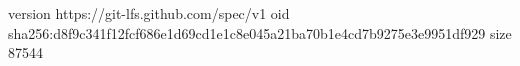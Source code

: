 version https://git-lfs.github.com/spec/v1
oid sha256:d8f9c341f12fcf686e1d69cd1e1c8e045a21ba70b1e4cd7b9275e3e9951df929
size 87544

